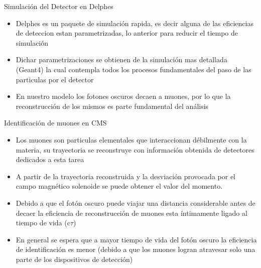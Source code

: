 

\begin{frame}{Simulaci\'on del Detector en Delphes}

\begin{itemize}
    \item Delphes es un paquete de simulaci\'on rapida, es decir alguna de las eficiencias de deteccion estan parametrizadas, lo anterior para reducir el tiempo de simulaci\'on 
    \item Dichar parametrizaciones se obtienen de la simulaci\'on mas detallada (Geant4) la cual contempla todos los procesos fundamentales del paso de las particulas por el detector
    \item En nuestro modelo los fotones oscuros decaen a muones, por lo que la reconstrucci\'on de los mismos es parte fundamental del an\'alisis
\end{itemize}
\end{frame}


\begin{frame}{Identificaci\'on de muones en CMS}
    
\begin{itemize}
\item Los muones son particulas elementales que interaccionan d\'ebilmente con la materia, su trayectoria se reconstruye con informaci\'on obtenida de detectores dedicados a esta tarea
\item A partir de la trayectoria reconstruida y la desviaci\'on provocada por el campo magn\'etico solenoide se puede obtener el valor del momento.
\item Debido a que el fot\'on oscuro puede viajar una distancia considerable antes de decaer la eficiencia de reconstrucci\'on de muones esta \'intimamente ligado al tiempo de vida (c$\tau$) 
\item En general se espera que a mayor tiempo de vida del fot\'on oscuro la eficiencia de identificaci\'on es menor (debido a que los muones logran atravesar solo una parte de los dispositivos de detecci\'on)
\end{itemize}
\end{frame}


